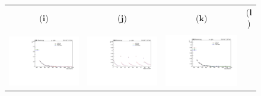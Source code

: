 \begin{figure}[htp]
\begin{tabular}{cccc}
($\mathbf{i}$)\qquad\qquad&($\mathbf{j}$)\qquad\qquad&($\mathbf{k}$)\qquad\qquad&($\mathbf{l}$)\qquad\qquad\\
\\
\hspace{-0.5cm}
\includegraphics[scale=0.22]{fig/chapt7/qcd/qcd_mu_ch/ttbar_m_ttsys_UpDn.pdf}
& \hspace{-0.95cm} \includegraphics[scale=0.22]{fig/chapt7/qcd/qcd_mu_ch/ttbar_m_cosine_ttsysUpDn.pdf}
& \hspace{-0.95cm} \includegraphics[scale=0.22]{fig/chapt7/qcd/qcd_e_ch/ttbar_m_ttsys_6perUpDn.pdf}

\end{tabular}
\end{figure}
